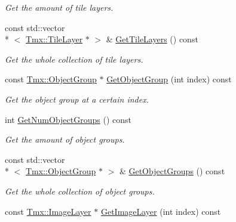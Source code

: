 \begin{DoxyCompactItemize}
\begin{DoxyCompactList}\small\item\em Get the amount of tile layers. \end{DoxyCompactList}\item 
\hypertarget{classTmx_1_1Map_a1e6a0eb80d60ef16af3ccc438ab8716f}{const std\-::vector\\*
$<$ \hyperlink{classTmx_1_1TileLayer}{Tmx\-::\-Tile\-Layer} $\ast$ $>$ \& \hyperlink{classTmx_1_1Map_a1e6a0eb80d60ef16af3ccc438ab8716f}{Get\-Tile\-Layers} () const }\label{classTmx_1_1Map_a1e6a0eb80d60ef16af3ccc438ab8716f}

\begin{DoxyCompactList}\small\item\em Get the whole collection of tile layers. \end{DoxyCompactList}\item 
\hypertarget{classTmx_1_1Map_a46c05a71369d22cfa55367b07d771b11}{const \hyperlink{classTmx_1_1ObjectGroup}{Tmx\-::\-Object\-Group} $\ast$ \hyperlink{classTmx_1_1Map_a46c05a71369d22cfa55367b07d771b11}{Get\-Object\-Group} (int index) const }\label{classTmx_1_1Map_a46c05a71369d22cfa55367b07d771b11}

\begin{DoxyCompactList}\small\item\em Get the object group at a certain index. \end{DoxyCompactList}\item 
\hypertarget{classTmx_1_1Map_aae09a01218a3fe3540347fb2ed65fccd}{int \hyperlink{classTmx_1_1Map_aae09a01218a3fe3540347fb2ed65fccd}{Get\-Num\-Object\-Groups} () const }\label{classTmx_1_1Map_aae09a01218a3fe3540347fb2ed65fccd}

\begin{DoxyCompactList}\small\item\em Get the amount of object groups. \end{DoxyCompactList}\item 
\hypertarget{classTmx_1_1Map_adcd29ef72e9649bd05a3579e9c61ed68}{const std\-::vector\\*
$<$ \hyperlink{classTmx_1_1ObjectGroup}{Tmx\-::\-Object\-Group} $\ast$ $>$ \& \hyperlink{classTmx_1_1Map_adcd29ef72e9649bd05a3579e9c61ed68}{Get\-Object\-Groups} () const }\label{classTmx_1_1Map_adcd29ef72e9649bd05a3579e9c61ed68}

\begin{DoxyCompactList}\small\item\em Get the whole collection of object groups. \end{DoxyCompactList}\item 
\hypertarget{classTmx_1_1Map_ad9c7fcc05963002e5c7efa71f4ba0cdb}{const \hyperlink{classTmx_1_1ImageLayer}{Tmx\-::\-Image\-Layer} $\ast$ \hyperlink{classTmx_1_1Map_ad9c7fcc05963002e5c7efa71f4ba0cdb}{Get\-Image\-Layer} (int index) const }\label{classTmx_1_1Map_ad9c7fcc05963002e5c7efa71f4ba0cdb}


\end{DoxyCompactItemize}
